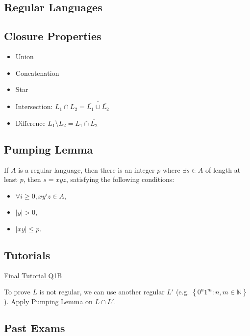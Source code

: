 \documentclass[10pt,landscape,a4paper]{article}
\newcommand{\N}{\mathbb{N}}
\newcommand{\set}[1]{\left \{ #1 \right \}}
\newcommand{\abs}[1]{\left | #1 \right |}
\begin{document}
\small

\begin{multicols*}{3}

\section{Regular Languages}

\subsection{Closure Properties}

\begin{itemize}
    \item Union
    \item Concatenation
    \item Star
    \item Intersection: $L_1 \cap L_2 = \overline{\overline{L_1} \cup \overline{L_2}}$
    \item Difference $L_1 \setminus L_2 = L_1 \cap \overline{L_2}$
\end{itemize}

\subsection{Pumping Lemma}

If $A$ is a regular language, then there is an integer $p$ where $\exists s \in A$ of length at least $p$, then $s = xyz$, satisfying the following conditions:

\begin{itemize}
    \item $\forall i \geq 0, xy^iz \in A$,
    \item $\abs{y} > 0$,
    \item $\abs{xy} \leq p$.
\end{itemize}

\subsection{Tutorials}

\underline{Final Tutorial Q1B}

To prove $L$ is not regular, we can use another regular $L'$ (e.g. $\set{0^n1^m: n, m \in \N}$). Apply Pumping Lemma on $L \cap L'$.

\subsection{Past Exams}


\end{multicols*}
\end{document}
